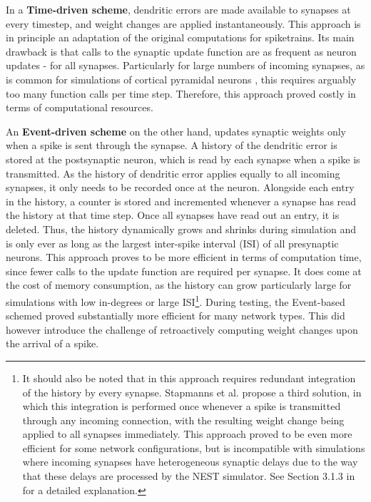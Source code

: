 In a \textbf{Time-driven scheme}, dendritic errors are made available to synapses at every timestep, and weight changes
are applied instantaneously. This approach is in principle an adaptation of the original computations for spiketrains.
Its main drawback is that calls to the synaptic update function are as frequent as neuron updates - for all synapses.
Particularly for large numbers of incoming synapses, as is common for simulations of cortical pyramidal neurons
\citep{potjans2014cell,vezoli2004quantitative}, this requires arguably too many function calls per time step. Therefore,
this approach proved costly in terms of computational resources.

An \textbf{Event-driven scheme} on the other hand, updates synaptic weights only when a spike is sent through the
synapse. A history of the dendritic error is stored at the postsynaptic neuron, which is read by each synapse when a
spike is transmitted. As the history of dendritic error applies equally to all incoming synapses, it only needs to be
recorded once at the neuron. Alongside each entry in the history, a counter is stored and incremented whenever a synapse
has read the history at that time step. Once all synapses have read out an entry, it is deleted. Thus, the history
dynamically grows and shrinks during simulation and is only ever as long as the largest inter-spike interval (ISI) of
all presynaptic neurons. This approach proves to be more efficient in terms of computation time, since fewer calls to
the update function are required per synapse. It does come at the cost of memory consumption, as the history can grow
particularly large for simulations with low in-degrees or large ISI\footnote{It should also be noted that in this
approach requires redundant integration of the history by every synapse. Stapmanns et al. propose a third solution, in
which this integration is performed once whenever a spike is transmitted through any incoming connection, with the
resulting weight change being applied to all synapses immediately. This approach proved to be even more efficient for
some network configurations, but is incompatible with simulations where incoming synapses have heterogeneous synaptic
delays due to the way that these delays are processed by the NEST simulator. See Section 3.1.3 in \citep{Stapmanns2021}
for a detailed explanation.}. During testing, the Event-based schemed proved substantially more efficient for many
network types. This did however introduce the challenge of retroactively computing weight changes  upon the arrival of a
spike.


